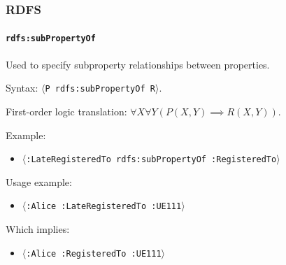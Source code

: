 \documentclass{beamer}
\newcommand{\triplet}[1]{$\langle$\texttt{#1}$\rangle$}
\begin{document}
\begin{frame}
  \frametitle{RDFS}
  \framesubtitle{\texttt{rdfs:subPropertyOf}}

  Used to specify subproperty relationships between properties.

  \pause

  \bigskip

  Syntax: \triplet{P rdfs:subPropertyOf R}.

  \pause

  \medskip

  First-order logic translation: $\forall X \forall Y (P(X, Y) \implies
                                                       R(X, Y))$.

  \pause

  \bigskip

  Example:

  \begin{itemize}
    \item \triplet{:LateRegisteredTo rdfs:subPropertyOf :RegisteredTo}
  \end{itemize}

  \pause

  Usage example:

  \begin{itemize}
    \item \triplet{:Alice :LateRegisteredTo :UE111}
  \end{itemize}

  \pause

  Which implies:

  \begin{itemize}
    \item \triplet{:Alice :RegisteredTo :UE111}
  \end{itemize}
\end{frame}
\end{document}
